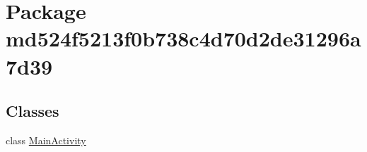 \hypertarget{namespacemd524f5213f0b738c4d70d2de31296a7d39}{
\section{Package md524f5213f0b738c4d70d2de31296a7d39}
\label{namespacemd524f5213f0b738c4d70d2de31296a7d39}
}
\subsection*{Classes}
\begin{CompactItemize}
\item 
class \hyperlink{classmd524f5213f0b738c4d70d2de31296a7d39_1_1_main_activity}{MainActivity}
\end{CompactItemize}

